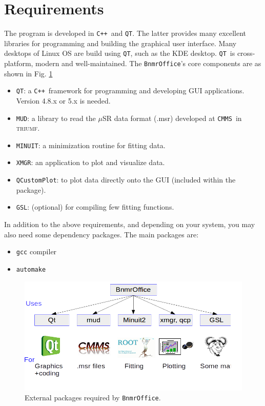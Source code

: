 \documentclass[10pt,letterpaper,oneside]{article}
\newcommand{\triumf}{\textsc{triumf}}
\newcommand{\cmms}{\texttt{CMMS}}
\newcommand{\cpp}{\texttt{C++}}
\newcommand{\qt}{\texttt{QT}}
\newcommand{\minuit}{\texttt{MINUIT}}
\newcommand{\mud}{\texttt{MUD}}
\newcommand{\xmgr}{\texttt{XMGR}}
\newcommand{\bof}{\texttt{BnmrOffice}}
\newcommand{\gsl}{\texttt{GSL}}
\newcommand{\qcp}{\texttt{QCustomPlot}}
\begin{document}
\section{Requirements}
The program is developed in \cpp\ and \qt. The latter provides many excellent libraries for programming and building the graphical user interface. Many desktops of Linux OS are build using \qt, such as the KDE desktop. \qt\ is cross-platform, modern and well-maintained.
The \bof's core components are as shown in Fig. \ref{fig-dep}
\begin{itemize}
 \item \qt: a \cpp\ framework for programming and developing GUI applications. Version 4.8.x or 5.x is needed.
 \item \mud: a library to read the $\mu$SR data format (.msr) developed at \cmms\ in \triumf.
 \item \minuit: a minimization routine for fitting data. 
 \item \xmgr: an application to plot and visualize data. 
 \item \qcp: to plot data directly onto the GUI (included within the package). 
 \item \gsl: (optional) for compiling few fitting functions.
\end{itemize}

In addition to the above requirements, and depending on your system, you may also need some dependency packages. The main packages are:
\begin{itemize}
 \item \texttt{gcc} compiler
 \item \texttt{automake} 
\end{itemize}

\begin{figure}[h]
\includegraphics[width=\textwidth]{dependency.png}
 \caption{External packages required by \bof.}
 \label{fig-dep}
 \end{figure}
\end{document}
